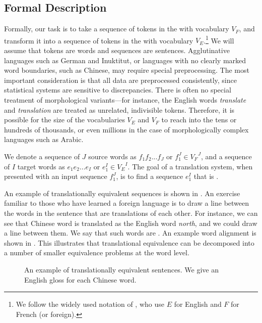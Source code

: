\subsection{Formal Description} \label{sec:formal-description}

Formally, our task is to take a sequence of tokens in
the  with vocabulary $V_F$, 
and transform it into a sequence of tokens in the 
 with vocabulary 
$V_E$.\footnote{We follow the widely used notation
of \citet{Brown:1993:cl}, who use $E$ for English and 
$F$ for French (or foreign).}  We will assume that 
tokens are words and sequences are sentences. 
Agglutinative languages
such as German and Inuktitut, or languages with no clearly marked
word boundaries, such as Chinese, may require special preprocessing. 
The most important consideration is that all data are
preprocessed consistently, since statistical systems are sensitive
to discrepancies.  There is often no special
treatment of morphological variants---for instance, the English 
words {\em translate} and {\em translation} are treated as unrelated,
indivisible tokens.  Therefore, it is possible for the size
of the vocabularies $V_E$ and $V_F$ to reach into the tens or
hundreds of thousands, or even millions in the case of 
morphologically complex languages such as Arabic.

We denote a sequence of $J$ source words 
as $f_1 f_2... f_J$ or $f_1^J \in {V_F}^J$, 
and a sequence of $I$ target words as 
$e_1 e_2... e_I$ or $e_1^I \in {V_E}^I$.
The goal of a translation system, when 
presented with an input sequence $f_1^J$,
is to find a sequence $e_1^I$ that is
. 

An example of translationally equivalent sequences is 
shown in .  An exercise
familiar to those who have learned a foreign
language is to draw a line between the words in the sentence
that are translations of each other.  For instance,
we can see that Chinese word  is translated as
the English word {\em north}, and we could draw 
a line between them.  We say that such 
words are .  An example word alignment is shown in 
.  This illustrates 
that translational equivalence can be decomposed into
a number of smaller equivalence problems at the word level.

\figpreamble
\begin{figure*}[t]
\figfontsize{\begin{center}

\end{center}}
\figpostamble
\caption[An example of translationally equivalent sentences.]{\label{fig:example}An example of translationally equivalent sentences.  We give an English gloss for each Chinese word.}
\end{figure*}

